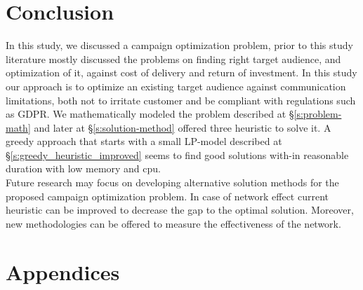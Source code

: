 \documentclass[11pt]{article}
\begin{document}
\section{Conclusion} \label{s:conclusion}
In this study, we discussed a campaign optimization problem, prior to this study literature mostly discussed the problems on finding right target audience, and optimization of it, against cost of delivery and return of investment. In this study our approach is to optimize an existing target audience against communication limitations, both not to irritate customer and be compliant with regulations such as GDPR. We mathematically modeled the problem described at \S \ref{s:problem-math} and later at \S \ref{s:solution-method} offered three heuristic to solve it. A greedy approach that starts with a small LP-model described at \S \ref{s:greedy_heuristic_improved} seems to find good solutions with-in reasonable duration with low memory and cpu.\\
Future research may focus on developing alternative solution methods for the proposed campaign optimization problem. In case of network effect current heuristic can be improved to decrease the gap to the optimal solution. Moreover, new methodologies can be offered to measure the effectiveness of the network.
\newpage

\newpage

\appendix
\section{Appendices}
\end{document}
